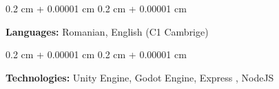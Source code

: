 \documentclass[10pt, letterpaper]{article}
\newenvironment{onecolentry}{
    \begin{adjustwidth}{
        0.2 cm + 0.00001 cm
    }{
        0.2 cm + 0.00001 cm
    }
}{
    \end{adjustwidth}
} %
\begin{document}
        \vspace{0.2 cm}

        \begin{onecolentry}
            \textbf{Languages: }Romanian, English (C1 Cambrige)
        \end{onecolentry}

        \vspace{0.2 cm}

        \begin{onecolentry}
            \textbf{Technologies:} Unity Engine, Godot Engine, Express , NodeJS
        \end{onecolentry}


    
\end{document}
